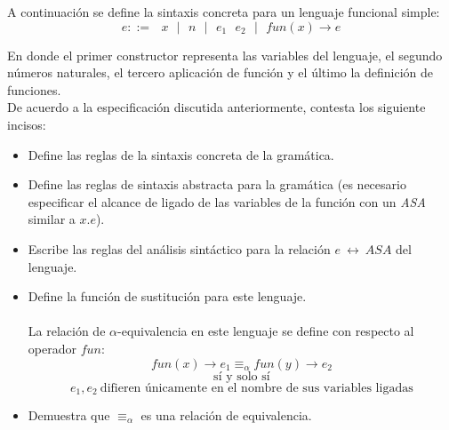     \bigskip

   \begin{exercise}
        A continuación se define la sintaxis concreta para un lenguaje funcional simple:
        \[ e ::=  \text{ $x$ } \text{$|$} \text{ $n$  }\text{$|$} \text{ } e_1 \text{ } e_2 \text{ } \text{$|$} \text{ } fun(x) \rightarrow e \]

    En donde el primer constructor representa las variables del lenguaje, el segundo números naturales,
    el tercero aplicación de función y el último la definición de funciones.\\

    De acuerdo a la especificación discutida anteriormente, contesta los siguiente incisos: \\
    \begin{itemize}
        \item Define las reglas de la sintaxis concreta de la gramática.
        \item Define las reglas de sintaxis abstracta para la gramática (es necesario especificar el alcance de ligado de las variables de la función con un \textit{ASA} similar a $x.e$).
        \item Escribe las reglas del análisis sintáctico  para la relación $e \ \longleftrightarrow\ ASA$ del lenguaje.
        \item Define la función de sustitución para este lenguaje. \\\\
        La relación de $\alpha$-equivalencia en este lenguaje se define con respecto al operador $fun$:
             \[ fun(x) \rightarrow e_1 \equiv_\alpha fun(y) \rightarrow e_2   \]
	  \[  \text{sí y solo sí}  \]
	  \[e_1, e_2 \  \text{difieren únicamente en el nombre de sus variables ligadas}\]
             \item Demuestra que $\equiv_\alpha$ es una relación de equivalencia.
    \end{itemize}

   \end{exercise}
    